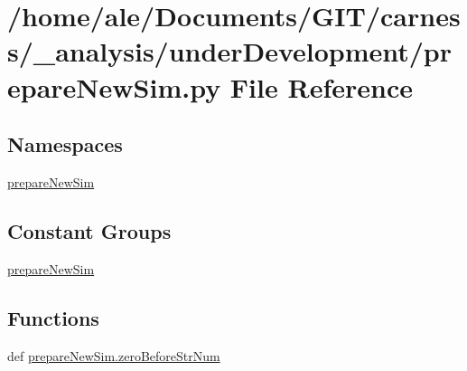 \hypertarget{a00053}{\section{/home/ale/\-Documents/\-G\-I\-T/carness/\-\_\-analysis/under\-Development/prepare\-New\-Sim.py File Reference}
\label{a00053}
}
\subsection*{Namespaces}
\begin{DoxyCompactItemize}
\item 
\hyperlink{a00113}{prepare\-New\-Sim}
\end{DoxyCompactItemize}
\subsection*{Constant Groups}
\begin{DoxyCompactItemize}
\item 
\hyperlink{a00113}{prepare\-New\-Sim}
\end{DoxyCompactItemize}
\subsection*{Functions}
\begin{DoxyCompactItemize}
\item 
def \hyperlink{a00113_a6b14bf9916da5f148ec52646dd61250d}{prepare\-New\-Sim.\-zero\-Before\-Str\-Num}
\end{DoxyCompactItemize}
